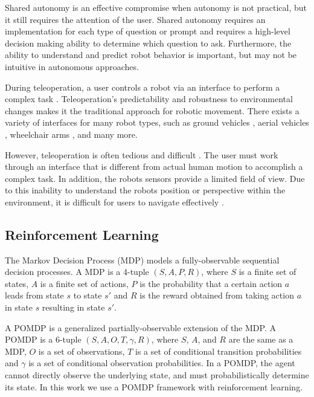\documentclass[letterpaper, 10 pt, conference]{ieeeconf}  %
\begin{document}
Shared autonomy is an effective compromise when autonomy is not practical, but it still requires the attention of the user. Shared autonomy requires an implementation for each type of question or prompt and requires a high-level decision making ability to determine which question to ask. Furthermore, the ability to understand and predict robot behavior is important, but may not be intuitive in autonomous approaches.


During teleoperation, a user controls a robot via an interface to perform a complex task \cite{Dragan_2013_7390}. Teleoperation's predictability and robustness to environmental changes makes it the traditional approach for robotic movement. There exists a variety of interfaces for many robot types, such as ground vehicles \cite{6256067}, aerial vehicles \cite{helicopter}, wheelchair arms \cite{1639157}, and many more.

However, teleoperation is often tedious and difficult \cite{Dragan_2013_7390}. The user must work through an interface that is different from actual human motion to accomplish a complex task. In addition, the robots sensors provide a limited field of view. Due to this inability to understand the robots position or perspective within the environment, it is difficult for users to navigate effectively \cite{Bruemmer:2005:SUC:2229264.2230046}.

\subsection{Reinforcement Learning}
The Markov Decision Process (MDP) models a fully-observable sequential decision processes. A MDP is a 4-tuple $(S,A,P,R)$, where $S$ is a finite set of states, $A$ is a finite set of actions, $P$ is the probability that a certain action $a$ leads from state $s$ to state $s'$ and $R$ is the reward obtained from taking action $a$ in state $s$ resulting in state $s'$. 

A POMDP is a generalized partially-observable extension of the MDP. A POMDP is a 6-tuple $(S,A,O, T, \gamma, R)$, where $S$, $A$, and $R$ are the same as a MDP, $O$ is a set of observations, $T$ is a set of conditional transition probabilities and $\gamma$ is a set of conditional observation probabilities. In a POMDP, the agent cannot directly observe the underlying state, and must probabilistically determine its state. In this work we use a POMDP framework with reinforcement learning.
\end{document}
